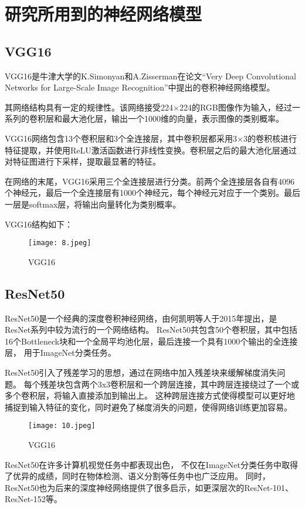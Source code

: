 \documentclass[AutoFakeBold]{LZUThesis}
\begin{document}
\section{研究所用到的神经网络模型}

\subsection{VGG16}
VGG16是牛津大学的K.Simonyan和A.Zisserman在论文“Very Deep Convolutional Networks for Large-Scale Image Recognition”中提出的卷积神经网络模型。 

其网络结构具有一定的规律性。该网络接受224×224的RGB图像作为输入，经过一系列的卷积层和最大池化层，输出一个1000维的向量，表示图像的类别概率。

VGG16网络包含13个卷积层和3个全连接层，其中卷积层都采用3×3的卷积核进行特征提取，并使用ReLU激活函数进行非线性变换。卷积层之后的最大池化层通过对特征图进行下采样，提取最显著的特征。

在网络的末尾，VGG16采用三个全连接层进行分类。前两个全连接层各自有4096个神经元，最后一个全连接层有1000个神经元，每个神经元对应于一个类别。最后一层是softmax层，将输出向量转化为类别概率。

VGG16结构如下：
\begin{figure}[H]
    \centering
    \texttt{[image: 8.jpeg]}
    \caption{VGG16}
    \label{figure}
 \end{figure}

\subsection{ResNet50}
ResNet50是一个经典的深度卷积神经网络，由何凯明等人于2015年提出，是ResNet系列中较为流行的一个网络结构。
ResNet50共包含50个卷积层，其中包括16个Bottleneck块和一个全局平均池化层，最后连接一个具有1000个输出的全连接层，
用于ImageNet分类任务。

ResNet50引入了残差学习的思想，通过在网络中加入残差块来缓解梯度消失问题。
每个残差块包含两个3x3卷积层和一个跨层连接，其中跨层连接绕过了一个或多个卷积层，将输入直接添加到输出上。
这种跨层连接方式使得模型可以更好地捕捉到输入特征的变化，同时避免了梯度消失的问题，使得网络训练更加容易。

\begin{figure}[H]
    \centering
    \texttt{[image: 10.jpeg]}
    \caption{VGG16}
    \label{figure}
 \end{figure}

ResNet50在许多计算机视觉任务中都表现出色，
不仅在ImageNet分类任务中取得了优异的成绩，同时在物体检测、语义分割等任务中也广泛应用。
同时，ResNet50也为后来的深度神经网络提供了很多启示，如更深层次的ResNet-101、ResNet-152等。
\end{document}
